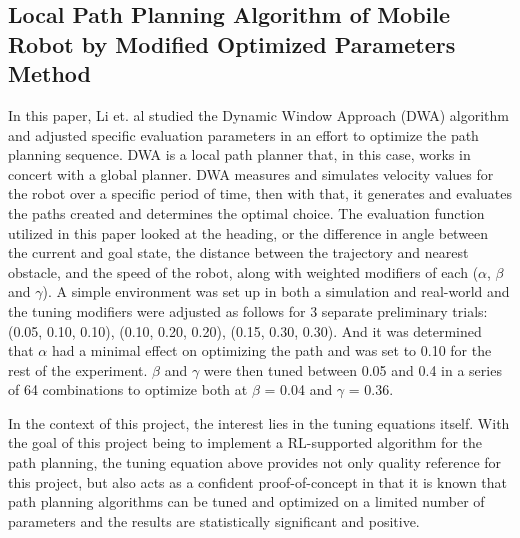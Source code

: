 \documentclass[conference]{IEEEtran}
\begin{document}
        \subsection{Local Path Planning Algorithm of Mobile Robot by Modified Optimized Parameters Method \cite{b2}}        
        In this paper, Li et. al studied the Dynamic Window Approach (DWA) algorithm and adjusted specific evaluation parameters in an effort to optimize the path planning sequence. DWA is a local path planner that, in this case, works in concert with a global planner. DWA measures and simulates velocity values for the robot over a specific period of time, then with that, it generates and evaluates the paths created and determines the optimal choice. The evaluation function utilized in this paper looked at the heading, or the difference in angle between the current and goal state, the distance between the trajectory and nearest obstacle, and the speed of the robot, along with weighted modifiers of each ($\alpha$, $\beta$ and $\gamma$).
        A simple environment was set up in both a simulation and real-world and the tuning modifiers were adjusted as follows for 3 separate preliminary trials: (0.05, 0.10, 0.10), (0.10, 0.20, 0.20), (0.15, 0.30, 0.30). And it was determined that $\alpha$ had a minimal effect on optimizing the path and was set to 0.10 for the rest of the experiment. $\beta$ and $\gamma$ were then tuned between 0.05 and 0.4 in a series of 64 combinations to optimize both at $\beta$ = 0.04 and $\gamma$ = 0.36. 

        In the context of this project, the interest lies in the tuning equations itself. With the goal of this project being to implement a RL-supported algorithm for the path planning, the tuning equation above provides not only quality reference for this project, but also acts as a confident proof-of-concept in that it is known that path planning algorithms can be tuned and optimized on a limited number of parameters and the results are statistically significant and positive.
\end{document}
